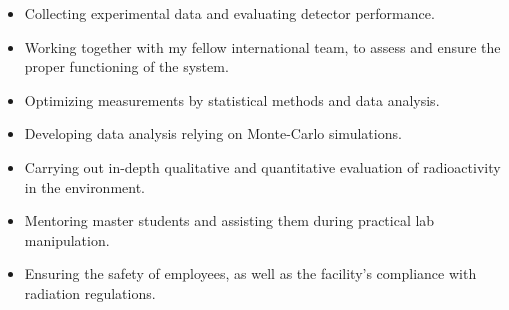 \documentclass[11pt,a4paper,roman]{moderncv}
\begin{document}
{
    \begin{itemize}
        \item Collecting experimental data and evaluating detector performance.
        \item Working together with my fellow international team, to assess and ensure the proper functioning of the system.
    \end{itemize}
} %

{
    \begin{itemize}
        \item Optimizing measurements by statistical methods and data analysis.
        \item Developing data analysis relying on Monte-Carlo simulations.
    \end{itemize}
} %


{
    \begin{itemize}
        \item Carrying out in-depth qualitative and quantitative evaluation of radioactivity in the environment.
        \item Mentoring master students and assisting them during practical lab manipulation.
        \item Ensuring the safety of employees, as well as the facility’s compliance with radiation regulations.
    \end{itemize}
} %

\end{document}
